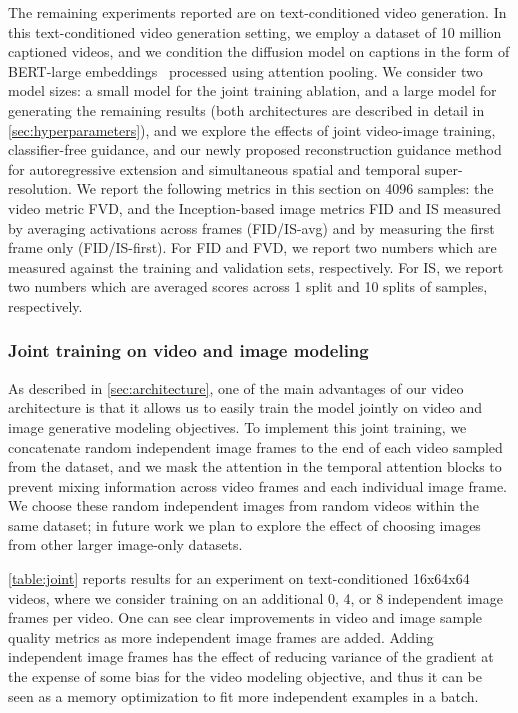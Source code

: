 The remaining experiments reported are on text-conditioned video generation. In this text-conditioned video generation setting, we employ a dataset of 10 million captioned videos, and we condition the diffusion model on captions in the form of BERT-large embeddings~\citep{devlin2019bert} processed using attention pooling. We consider two model sizes: a small model for the joint training ablation, and a large model for generating the remaining results (both architectures are described in detail in \ref{sec:hyperparameters}), and we explore the effects of joint video-image training, classifier-free guidance, and our newly proposed reconstruction guidance method for autoregressive extension and simultaneous spatial and temporal super-resolution. We report the following metrics in this section on 4096 samples: the video metric FVD, and the Inception-based image metrics FID and IS measured by averaging activations across frames (FID/IS-avg) and by measuring the first frame only (FID/IS-first). For FID and FVD, we report two numbers which are measured against the training and validation sets, respectively. For IS, we report two numbers which are averaged scores across 1 split and 10 splits of samples, respectively.

\subsubsection{Joint training on video and image modeling}
\label{sec:joint}

As described in \ref{sec:architecture}, one of the main advantages of our video architecture is that it allows us to easily train the model jointly on video and image generative modeling objectives. To implement this joint training, we concatenate random independent image frames to the end of each video sampled from the dataset, and we mask the attention in the temporal attention blocks to prevent mixing information across video frames and each individual image frame. We choose these random independent images from random videos within the same dataset; in future work we plan to explore the effect of choosing images from other larger image-only datasets.

\ref{table:joint} reports results for an experiment on text-conditioned 16x64x64 videos, where we consider training on an additional 0, 4, or 8 independent image frames per video. One can see clear improvements in video and image sample quality metrics as more independent image frames are added. Adding independent image frames has the effect of reducing variance of the gradient at the expense of some bias for the video modeling objective, and thus it can be seen as a memory optimization to fit more independent examples in a batch.

